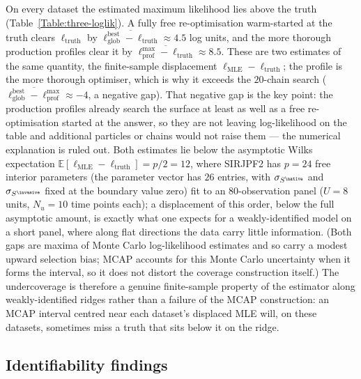 {On every dataset the estimated maximum likelihood lies above the truth (Table~\ref{Table:three-loglik}).
A fully free re-optimisation warm-started at the truth clears $\ell_{\text{truth}}$ by $\overline{\ell_{\text{glob}}^{\text{best}} - \ell_{\text{truth}}} \approx 4.5$ log units, and the more thorough production profiles clear it by $\overline{\ell_{\text{prof}}^{\max} - \ell_{\text{truth}}} \approx 8.5$.
These are two estimates of the same quantity, the finite-sample displacement $\ell_{\text{MLE}} - \ell_{\text{truth}}$; the profile is the more thorough optimiser, which is why it exceeds the $20$-chain search ($\overline{\ell_{\text{glob}}^{\text{best}} - \ell_{\text{prof}}^{\max}} \approx -4$, a negative gap).
That negative gap is the key point: the production profiles already search the surface at least as well as a free re-optimisation started at the answer, so they are not leaving log-likelihood on the table and additional particles or chains would not raise them --- the numerical explanation is ruled out.
Both estimates lie below the asymptotic Wilks expectation $\mathbb{E}[\ell_{\text{MLE}} - \ell_{\text{truth}}] = p/2 = 12$, where SIRJPF2 has $p = 24$ free interior parameters (the parameter vector has $26$ entries, with $\sigma_{S^{\native}}$ and $\sigma_{S^{\invasive}}$ fixed at the boundary value zero) fit to an $80$-observation panel ($U = 8$ units, $N_u = 10$ time points each); a displacement of this order, below the full asymptotic amount, is exactly what one expects for a weakly-identified model on a short panel, where along flat directions the data carry little information.
(Both gaps are maxima of Monte Carlo log-likelihood estimates and so carry a modest upward selection bias; MCAP accounts for this Monte Carlo uncertainty when it forms the interval, so it does not distort the coverage construction itself.)
The undercoverage is therefore a genuine finite-sample property of the estimator along weakly-identified ridges rather than a failure of the MCAP construction: an MCAP interval centred near each dataset's displaced MLE will, on these datasets, sometimes miss a truth that sits below it on the ridge.}

\subsection{Identifiability findings}

